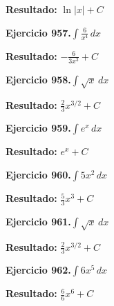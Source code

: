 \documentclass[10pt,a4paper]{article}
\begin{document}
\begin{solbox}
\textbf{Resultado:} \(\displaystyle \ln|x| + C\)
\end{solbox}

\begin{ejbox}
\textbf{Ejercicio 957.}\quad $\int \frac{6}{x^{4}}\,dx$
\end{ejbox}

\begin{solbox}
\textbf{Resultado:} \(\displaystyle -\frac{6}{3x^{3}} + C\)
\end{solbox}

\newpage
\begin{ejbox}
\textbf{Ejercicio 958.}\quad $\int \sqrt{x}\,dx$
\end{ejbox}

\begin{solbox}
\textbf{Resultado:} \(\displaystyle \frac{2}{3}x^{3/2} + C\)
\end{solbox}

\begin{ejbox}
\textbf{Ejercicio 959.}\quad $\int e^x\,dx$
\end{ejbox}

\begin{solbox}
\textbf{Resultado:} \(\displaystyle e^x + C\)
\end{solbox}

\begin{ejbox}
\textbf{Ejercicio 960.}\quad $\int 5x^{2}\,dx$
\end{ejbox}

\begin{solbox}
\textbf{Resultado:} \(\displaystyle \frac{5}{3}x^{3} + C\)
\end{solbox}

\newpage
\begin{ejbox}
\textbf{Ejercicio 961.}\quad $\int \sqrt{x}\,dx$
\end{ejbox}

\begin{solbox}
\textbf{Resultado:} \(\displaystyle \frac{2}{3}x^{3/2} + C\)
\end{solbox}

\begin{ejbox}
\textbf{Ejercicio 962.}\quad $\int 6x^{5}\,dx$
\end{ejbox}

\begin{solbox}
\textbf{Resultado:} \(\displaystyle \frac{6}{6}x^{6} + C\)
\end{solbox}
\end{document}
